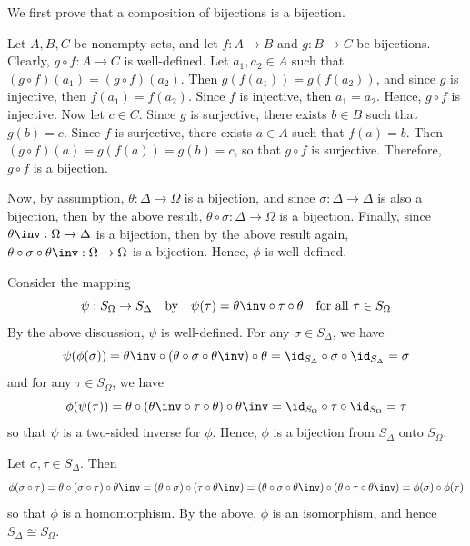 \begin{solalph}
    \item We first prove that a composition of bijections is a bijection.
    
    \begin{lemma}
        Let $A, B, C$ be nonempty sets, and let $f : A \to B$ and $g : B \to C$ be bijections. Clearly, $g \circ f : A \to C$ is well-defined. Let $a_1, a_2 \in A$ such that $(g \circ f)(a_1) = (g \circ f)(a_2)$. Then $g(f(a_1)) = g(f(a_2))$, and since $g$ is injective, then $f(a_1) = f(a_2)$. Since $f$ is injective, then $a_1 = a_2$. Hence, $g \circ f$ is injective. Now let $c \in C$. Since $g$ is surjective, there exists $b \in B$ such that $g(b) = c$. Since $f$ is surjective, there exists $a \in A$ such that $f(a) = b$. Then $(g \circ f)(a) = g(f(a)) = g(b) = c$, so that $g \circ f$ is surjective. Therefore, $g \circ f$ is a bijection.
    \end{lemma}
    
    Now, by assumption, $\theta : \Delta \to \Omega$ is a bijection, and since $\sigma : \Delta \to \Delta$ is also a bijection, then by the above result, $\theta \circ \sigma : \Delta \to \Omega$ is a bijection. Finally, since $\theta\inv : \Omega \to \Delta$ is a bijection, then by the above result again, $\theta \circ \sigma \circ \theta\inv : \Omega \to \Omega$ is a bijection. Hence, $\phi$ is well-defined.
    \item Consider the mapping 
    \[\psi : S_\Omega \to S_\Delta\quad \text{by} \quad \psi(\tau) = \theta\inv \circ \tau \circ \theta \quad \text{for all } \tau \in S_\Omega\]
    By the above discussion, $\psi$ is well-defined. For any $\sigma \in S_\Delta$, we have
    \[\psi(\phi(\sigma)) = \theta\inv \circ (\theta \circ \sigma \circ \theta\inv) \circ \theta = \id_{S_\Delta} \circ \sigma \circ \id_{S_\Delta} = \sigma\]
    and for any $\tau \in S_\Omega$, we have
    \[\phi(\psi(\tau)) = \theta \circ (\theta\inv \circ \tau \circ \theta) \circ \theta\inv = \id_{S_\Omega} \circ \tau \circ \id_{S_\Omega} = \tau\]
    so that $\psi$ is a two-sided inverse for $\phi$. Hence, $\phi$ is a bijection from $S_\Delta$ onto $S_\Omega$.
    \item Let $\sigma, \tau \in S_\Delta$. Then
    \[\phi(\sigma \circ \tau) = \theta \circ (\sigma \circ \tau) \circ \theta\inv = (\theta \circ \sigma) \circ (\tau \circ \theta\inv) = (\theta \circ \sigma \circ \theta\inv) \circ (\theta \circ \tau \circ \theta\inv) = \phi(\sigma) \circ \phi(\tau)\]
    so that $\phi$ is a homomorphism. By the above, $\phi$ is an isomorphism, and hence $S_\Delta \cong S_\Omega$.
\end{solalph}

